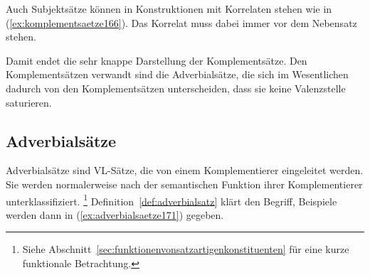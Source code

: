 \begin{exe}
  \ex\label{ex:komplementsaetze162}
  \begin{xlist}
  \end{xlist}
\end{exe}

Auch Subjektsätze können in Konstruktionen mit Korrelaten stehen wie in (\ref{ex:komplementsaetze166}).
Das Korrelat muss dabei immer vor dem Nebensatz stehen.

\begin{exe}
  \ex\label{ex:komplementsaetze166}
  \begin{xlist}
  \end{xlist}
\end{exe}

Damit endet die sehr knappe Darstellung der Komplementsätze.
Den Komplementsätzen verwandt sind die Adverbialsätze, die sich im Wesentlichen dadurch von den Komplementsätzen unterscheiden, dass sie keine Valenzstelle saturieren.

\subsection{Adverbialsätze}
\label{sec:adverbialsaetze}


Adverbialsätze sind VL-Sätze, die von einem Komplementierer eingeleitet werden.
Sie werden normalerweise nach der semantischen Funktion ihrer Komplementierer unterklassifiziert.%
\footnote{Siehe Abschnitt~\ref{sec:funktionenvonsatzartigenkonstituenten} für eine kurze funktionale Betrachtung.}
Definition~\ref{def:adverbialsatz} klärt den Begriff, Beispiele werden dann in (\ref{ex:adverbialsaetze171}) gegeben.


